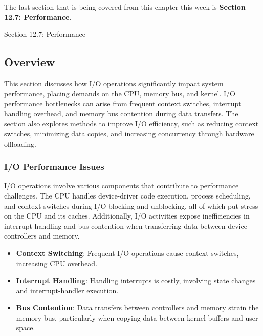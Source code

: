 The last section that is being covered from this chapter this week is \textbf{Section 12.7: Performance}.

\begin{notes}{Section 12.7: Performance}
    \subsection*{Overview}

    This section discusses how I/O operations significantly impact system performance, placing demands on the CPU, memory bus, and kernel. I/O performance bottlenecks can arise from frequent context 
    switches, interrupt handling overhead, and memory bus contention during data transfers. The section also explores methods to improve I/O efficiency, such as reducing context switches, minimizing 
    data copies, and increasing concurrency through hardware offloading.
    
    \subsubsection*{I/O Performance Issues}
    
    I/O operations involve various components that contribute to performance challenges. The CPU handles device-driver code execution, process scheduling, and context switches during I/O blocking and 
    unblocking, all of which put stress on the CPU and its caches. Additionally, I/O activities expose inefficiencies in interrupt handling and bus contention when transferring data between device 
    controllers and memory.
    
    \begin{highlight}
    
        \begin{itemize}
            \item \textbf{Context Switching}: Frequent I/O operations cause context switches, increasing CPU overhead.
            \item \textbf{Interrupt Handling}: Handling interrupts is costly, involving state changes and interrupt-handler execution.
            \item \textbf{Bus Contention}: Data transfers between controllers and memory strain the memory bus, particularly when copying data between kernel buffers and user space.
        \end{itemize}
    
    \end{highlight}
    

\end{notes}
